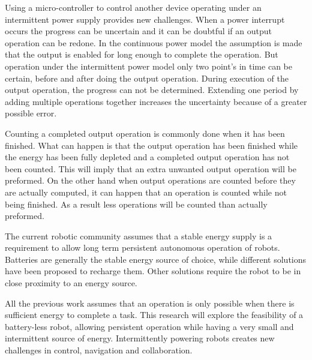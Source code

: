\documentclass[letterpaper, 10 pt, conference]{ieeeconf}  %
\begin{document}
Using a micro-controller to control another device operating under an intermittent power supply provides new challenges.
When a power interrupt occurs the progress can be uncertain and it can be doubtful if an output operation can be redone.
In the continuous power model the assumption is made that the output is enabled for long enough to complete the operation.
But operation under the intermittent power model only two point's in time can be certain, before and after doing the output operation.
During execution of the output operation, the progress can not be determined. %
Extending one period by adding multiple operations together increases the uncertainty because of a greater possible error.

Counting a completed output operation is commonly done when it has been finished.
What can happen is that the output operation has been finished while the energy has been fully depleted and a completed output operation has not been counted.
This will imply that an extra unwanted output operation will be preformed.
On the other hand when output operations are counted before they are actually computed, it can happen that an operation is counted while not being finished.
As a result less operations will be counted than actually preformed.



The current robotic community assumes that a stable energy supply is a requirement to allow long term persistent autonomous operation of robots.
Batteries are generally the stable energy source of choice, while different solutions have been proposed to recharge them.
Other solutions require the robot to be in close proximity to an energy source.



% 
All the previous work assumes that an operation is only possible when there is sufficient energy to complete a task.
This research will explore the feasibility of a battery-less robot, allowing persistent operation while having a very small and intermittent source of energy.
Intermittently powering robots creates new challenges in control, navigation and collaboration.
\end{document}
